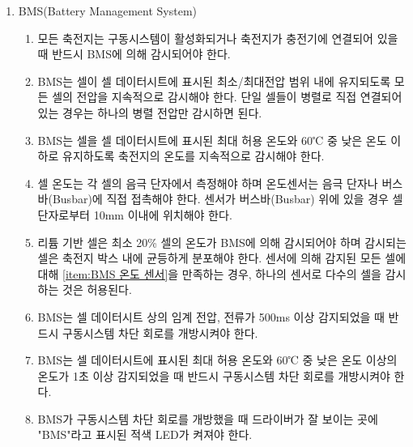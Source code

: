\documentclass[final,a4paper,10pt]{report}
\begin{document}
\begin{enumerate}
  \item\label{rule:formula-technical.accumulator-container.bms} BMS(Battery Management System)
    \begin{enumerate}
      \item\label{rule:formula-technical.accumulator-container.bms.active-or-charging} 모든 축전지는 구동시스템이 활성화되거나 축전지가 충전기에 연결되어 있을 때 반드시 BMS에 의해 감시되어야 한다.
      \item\label{rule:formula-technical.accumulator-container.bms.voltage-monitoring} BMS는 셀이 셀 데이터시트에 표시된 최소/최대전압 범위 내에 유지되도록 모든 셀의 전압을 지속적으로 감시해야 한다. 단일 셀들이 병렬로 직접 연결되어 있는 경우는 하나의 병렬 전압만 감시하면 된다.
      \item\label{rule:formula-technical.accumulator-container.bms.temperature-monitoring} BMS는 셀을 셀 데이터시트에 표시된 최대 허용 온도와 60℃ 중 낮은 온도 이하로 유지하도록 축전지의 온도를 지속적으로 감시해야 한다.
      \item\label{rule:formula-technical.accumulator-container.bms.temp-sensor-placement} 셀 온도는 각 셀의 음극 단자에서 측정해야 하며 온도센서는 음극 단자나 버스바(Busbar)에 직접 접촉해야 한다. 센서가 버스바(Busbar) 위에 있을 경우 셀 단자로부터 10mm 이내에 위치해야 한다. \label{item:BMS 온도 센서}
      \item\label{rule:formula-technical.accumulator-container.bms.lithium-temp-coverage} 리튬 기반 셀은 최소 20\% 셀의 온도가 BMS에 의해 감시되어야 하며 감시되는 셀은 축전지 박스 내에 균등하게 분포해야 한다. 센서에 의해 감지된 모든 셀에 대해 \ref{item:BMS 온도 센서}을 만족하는 경우, 하나의 센서로 다수의 셀을 감시하는 것은 허용된다.
      \item\label{rule:formula-technical.accumulator-container.bms.voltage-current-trip-500ms} {\color{blue}BMS는 셀 데이터시트 상의 임계 전압, 전류가 500ms 이상 감지되었을 때 반드시 구동시스템 차단 회로를 개방시켜야 한다.}
      \item\label{rule:formula-technical.accumulator-container.bms.overtemp-trip-1s} {\color{blue}BMS는 셀 데이터시트에 표시된 최대 허용 온도와 60℃ 중 낮은 온도 이상의 온도가 1초 이상 감지되었을 때 반드시 구동시스템 차단 회로를 개방시켜야 한다.}
      \item\label{rule:formula-technical.accumulator-container.bms.trip-indicator-led} BMS가 구동시스템 {\color{blue}차단 회로를 개방했을} 때 드라이버가 잘 보이는 곳에 "BMS"라고 표시된 적색 LED가 켜져야 한다.
    \end{enumerate}
\end{enumerate}
\end{document}
